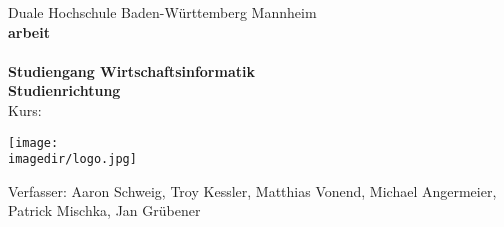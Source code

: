 \begin{titlepage}
\begin{minipage}{\textwidth}
		\vspace{-2cm}
\end{minipage}
\vspace{1em}
\begin{center}
	{\textsf{\large Duale Hochschule Baden-W\"urttemberg Mannheim}}\\[4em]
	{\textsf{\textbf{\large{\DieArtDerArbeit}arbeit}}}\\[6mm]
	{\textsf{\textbf{\Large{}\DerTitelDerArbeit}}} \\[1.5cm]
	{\textsf{\textbf{\large{}Studiengang Wirtschaftsinformatik}}\\[6mm]
	\textsf{\textbf{Studienrichtung \DieStudienrichtung}}}\\[6mm]
	\textsf{Kurs: \DieKursbezeichnung} \\[3cm]
	\begin{center}
		\texttt{[image: \\imagedir/logo.jpg]}	
	\end{center}
	Verfasser: Aaron Schweig, Troy Kessler, Matthias Vonend, Michael Angermeier, Patrick Mischka, Jan Grübener
\end{center}
\end{titlepage}